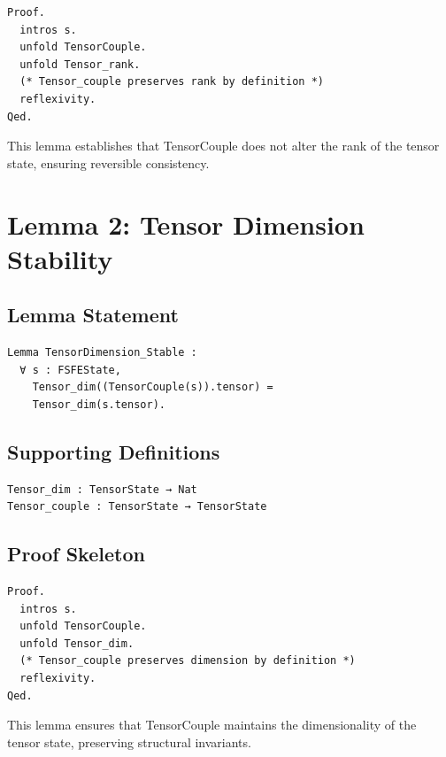 \documentclass[11pt]{article}
\begin{document}
\begin{verbatim}
Proof.
  intros s.
  unfold TensorCouple.
  unfold Tensor_rank.
  (* Tensor_couple preserves rank by definition *)
  reflexivity.
Qed.
\end{verbatim}

This lemma establishes that TensorCouple does not alter the rank of the tensor
state, ensuring reversible consistency.

\newpage


\section{Lemma 2: Tensor Dimension Stability}

\subsection{Lemma Statement}

\begin{verbatim}
Lemma TensorDimension_Stable :
  ∀ s : FSFEState,
    Tensor_dim((TensorCouple(s)).tensor) =
    Tensor_dim(s.tensor).
\end{verbatim}

\subsection{Supporting Definitions}

\begin{verbatim}
Tensor_dim : TensorState → Nat
Tensor_couple : TensorState → TensorState
\end{verbatim}

\subsection{Proof Skeleton}

\begin{verbatim}
Proof.
  intros s.
  unfold TensorCouple.
  unfold Tensor_dim.
  (* Tensor_couple preserves dimension by definition *)
  reflexivity.
Qed.
\end{verbatim}

This lemma ensures that TensorCouple maintains the dimensionality of the tensor
state, preserving structural invariants.

\newpage
\end{document}
